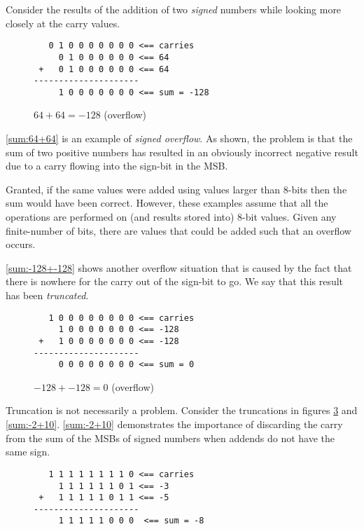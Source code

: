 Consider the results of the addition of two {\em signed} numbers
while looking more closely at the carry values.

\begin{figure}[H]
\centering
\begin{BVerbatim}
   0 1 0 0 0 0 0 0 0 <== carries
     0 1 0 0 0 0 0 0 <== 64
 +   0 1 0 0 0 0 0 0 <== 64
---------------------
     1 0 0 0 0 0 0 0 <== sum = -128
\end{BVerbatim}
\caption{$64+64 = -128$ (overflow)}
\label{sum:64+64}
\end{figure}



\autoref{sum:64+64} is an example of {\em signed overflow}.  As shown, the problem is 
that the sum of two positive numbers has resulted in an obviously incorrect
negative result due to a carry flowing into the sign-bit in the MSB.

Granted, if the same values were added using values larger than 8-bits 
then the sum would have been correct.  However, these examples assume that 
all the operations are performed on (and results stored into) 8-bit values.  
Given any finite-number of bits, there are values that could be added such that
an overflow occurs.

\autoref{sum:-128+-128} shows another overflow situation that is caused 
by the fact that there is nowhere for the carry out of the sign-bit to go.  
We say that this result has been {\em truncated}.

\begin{figure}[H]
\centering
\begin{BVerbatim}
   1 0 0 0 0 0 0 0 0 <== carries
     1 0 0 0 0 0 0 0 <== -128
 +   1 0 0 0 0 0 0 0 <== -128
---------------------
     0 0 0 0 0 0 0 0 <== sum = 0 
\end{BVerbatim}
\caption{$-128+-128 = 0$ (overflow)}
\label{sum:-128+-128}
\end{figure}

Truncation is not necessarily a problem.  Consider the truncations in
figures \ref{sum:-3+-5} and \ref{sum:-2+10}.  
\autoref{sum:-2+10} demonstrates the importance of discarding 
the carry from the sum of the MSBs of signed numbers when addends
do not have the same sign.

\begin{figure}[H]
\centering
\begin{BVerbatim}
   1 1 1 1 1 1 1 1 0 <== carries
     1 1 1 1 1 1 0 1 <== -3
 +   1 1 1 1 1 0 1 1 <== -5
---------------------
     1 1 1 1 1 0 0 0  <== sum = -8
\end{BVerbatim}
\label{sum:-3+-5}
\end{figure}


